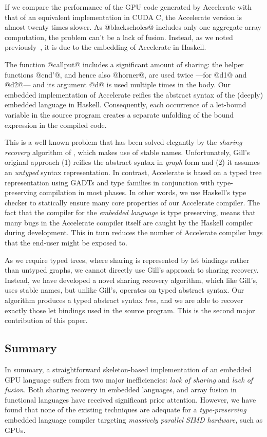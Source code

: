 If we compare the performance of the GPU code generated by Accelerate with that of an equivalent implementation in CUDA C, the Accelerate version is almost twenty times slower. As @blackscholes@ includes only one aggregate array computation, the problem can't be a lack of fusion. Instead, as we noted previously~\cite{Chakravarty:Accelerate}, it is due to the embedding of Accelerate in Haskell.

The function @callput@ includes a significant amount of sharing: the helper functions @cnd'@, and hence also @horner@, are used twice ---for @d1@ and @d2@--- and its argument @d@ is used multiple times in the body. Our embedded implementation of Accelerate reifies the abstract syntax of the (deeply) embedded language in Haskell. Consequently, each occurrence of a let-bound variable in the source program creates a separate unfolding of the bound expression in the compiled code.

This is a well known problem that has been solved elegantly by the \emph{sharing recovery} algorithm of \citet{Gill:2009dx}, which makes use of stable names. Unfortunately, Gill's original approach (1) reifies the abstract syntax in \emph{graph} form and (2) it assumes an \emph{untyped} syntax representation. In contrast, Accelerate is based on a typed tree representation using GADTs and type families in conjunction with type-preserving compilation in most phases. In other words, we use Haskell's type checker to statically ensure many core properties of our Accelerate compiler. The fact that the compiler for the \emph{embedded language} is type preserving, means that many bugs in the Accelerate compiler itself are caught by the Haskell compiler during development. This in turn reduces the number of Accelerate compiler bugs that the end-user might be exposed to.

As we require typed trees, where sharing is represented by let bindings rather than untyped graphs, we cannot directly use Gill's approach to sharing recovery. Instead, we have developed a novel sharing recovery algorithm, which like Gill's, uses stable names, but unlike Gill's, operates on typed abstract syntax. Our algorithm produces a typed abstract syntax \emph{tree}, and we are able to recover exactly those let bindings used in the source program. This is the second major contribution of this paper.


\subsection{Summary}
In summary, a straightforward skeleton-based implementation of an embedded GPU language suffers from two major inefficiencies: \emph{lack of sharing} and \emph{lack of fusion.} Both sharing recovery in embedded languages, and array fusion in functional languages have received significant prior attention. However, we have found that none of the existing techniques are adequate for a \emph{type-preserving} embedded language compiler targeting \emph{massively parallel SIMD hardware,} such as GPUs.

